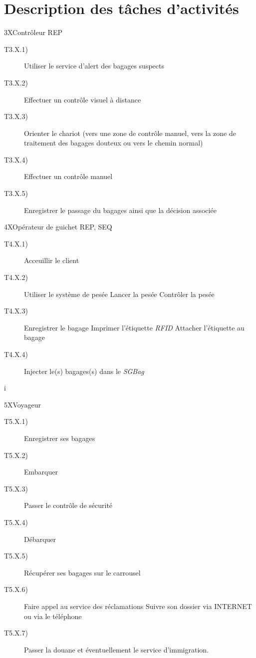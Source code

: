\part{Description des tâches d'activités}

\dta
{3}{X}{Contrôleur}
{REP}
{
\begin{description}
	\item [T3.X.1)] Utiliser le service d'alert des bagages suspects
	\item [T3.X.2)] Effectuer un contrôle visuel à distance
	\item [T3.X.3)] Orienter le chariot (vers une zone de contrôle manuel, vers la zone de traitement des bagages douteux ou vers le chemin \og normal\fg)
	\item [T3.X.4)] Effectuer un contrôle manuel
	\item [T3.X.5)] Enregistrer le passage du bagages ainsi que la décision associée	
\end{description}
}

\dta
{4}{X}{Opérateur de guichet}
{REP, SEQ}
{
\begin{description}
	\item [T4.X.1)] Acceuillir le client
	\item [T4.X.2)] Utiliser le système de pesée
		\subitem [T4.X.2.1)] Lancer la pesée
		\subitem [T4.X.2.1)] Contrôler la pesée

	\item [T4.X.3)] Enregistrer le bagage
		\subitem [T4.X.3.1] Imprimer l'étiquette \textsl{RFID}
		\subitem [T4.X.3.1] Attacher l'étiquette au bagage
		
	\item [T4.X.4)] Injecter le(s) bagages(s) dans le \textsl{SGBag} 
\end{description}
}i

\dta
{5}{X}{Voyageur}
{
\begin{description}
	\item [T5.X.1)] Enregistrer ses bagages
	\item [T5.X.2)] Embarquer
	\item [T5.X.3)] Passer le contrôle de sécurité
	\item [T5.X.4)] Débarquer
	\item [T5.X.5)] Récupérer ses bagages sur le carrousel
	\item [T5.X.6)] Faire appel au service des réclamations
		\subitem [T5.X.6.1)] Suivre son dossier via INTERNET ou via le téléphone
	\item [T5.X.7)] Passer la douane et éventuellement le service d'immigration.
\end{description}
}

